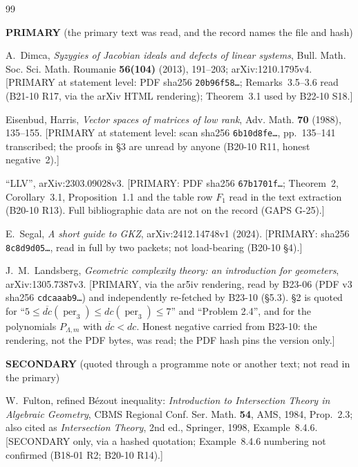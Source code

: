 \documentclass[11pt]{amsart}
\theoremstyle{plain}
\theoremstyle{definition}
\theoremstyle{remark}
\DeclareMathOperator{\per}{per}
\begin{document}
\begin{thebibliography}{99}

\item[] \textbf{PRIMARY} (the primary text was read, and the record names the file and hash)

 A.~Dimca, \emph{Syzygies of Jacobian ideals and defects of linear systems},
Bull. Math. Soc. Sci. Math. Roumanie \textbf{56(104)} (2013), 191--203; arXiv:1210.1795v4.
[PRIMARY at statement level: PDF sha256 \texttt{20b96f58\dots}; Remarks~3.5--3.6 read (B21-10
R17, via the arXiv HTML rendering); Theorem~3.1 used by B22-10 S18.]

 Eisenbud, Harris, \emph{Vector spaces of matrices of low rank}, Adv. Math.
\textbf{70} (1988), 135--155. [PRIMARY at statement level: scan sha256 \texttt{6b10d8fe\dots},
pp.~135--141 transcribed; the proofs in \S3 are unread by anyone (B20-10 R11, honest negative~2).]

 ``LLV'', arXiv:2303.09028v3. [PRIMARY: PDF sha256 \texttt{67b1701f\dots}; Theorem~2,
Corollary~3.1, Proposition~1.1 and the table row $F_1$ read in the text extraction (B20-10 R13).
Full bibliographic data are not on the record (GAPS G-25).]

 E.~Segal, \emph{A short guide to GKZ}, arXiv:2412.14748v1 (2024). [PRIMARY:
sha256 \texttt{8c8d9d05\dots}, read in full by two packets; not load-bearing (B20-10 \S4).]

 J.~M.~Landsberg, \emph{Geometric complexity theory: an introduction for
geometers}, arXiv:1305.7387v3. [PRIMARY, via the ar5iv rendering, read by B23-06 (PDF v3 sha256
\texttt{cdcaaab9\dots}) and independently re-fetched by B23-10 (\S5.3). \S2 is quoted for
``$5\le\overline{dc}(\per_3)\le dc(\per_3)\le7$'' and ``Problem 2.4'', and for the polynomials
$P_{\Lambda,m}$ with $\overline{dc}<dc$. Honest negative carried from B23-10: the rendering, not
the PDF bytes, was read; the PDF hash pins the version only.]

\item[] \textbf{SECONDARY} (quoted through a programme note or another text; not read in the primary)

 W.~Fulton, refined B\'ezout inequality: \emph{Introduction to Intersection
Theory in Algebraic Geometry}, CBMS Regional Conf. Ser. Math. \textbf{54}, AMS, 1984, Prop.~2.3;
also cited as \emph{Intersection Theory}, 2nd ed., Springer, 1998, Example~8.4.6. [SECONDARY only,
via a hashed quotation; Example~8.4.6 numbering not confirmed (B18-01 R2; B20-10 R14).]


\end{thebibliography}
\end{document}
